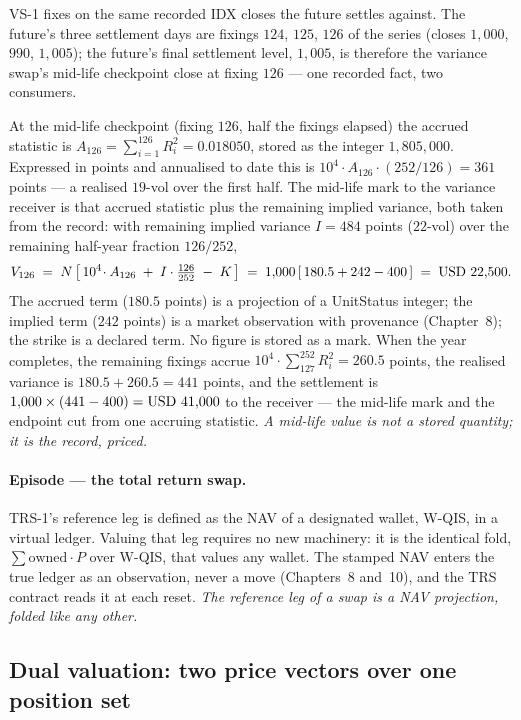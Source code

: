 VS-1 fixes on the same recorded IDX closes the future settles against. The
future's three settlement days are fixings $124$, $125$, $126$ of the series
(closes $1{,}000$, $990$, $1{,}005$); the future's final settlement level,
$1{,}005$, is therefore the variance swap's mid-life checkpoint close at fixing
$126$ --- one recorded fact, two consumers.

At the mid-life checkpoint (fixing $126$, half the fixings elapsed) the accrued
statistic is $A_{126} = \sum_{i=1}^{126} R_i^2 = 0.018050$, stored as the
integer $1{,}805{,}000$. Expressed in points and annualised to date this is
$10^4 \cdot A_{126}\cdot(252/126) = 361$ points --- a realised $19$-vol over the
first half. The mid-life mark to the variance receiver is that accrued
statistic plus the remaining implied variance, both taken from the record: with
remaining implied variance $I = 484$ points ($22$-vol) over the remaining
half-year fraction $126/252$,
\[
  V_{126} \;=\; N\left[\,10^4\!\cdot A_{126} \;+\; I\cdot\tfrac{126}{252} \;-\; K\,\right]
         \;=\; 1{,}000\left[\,180.5 + 242 - 400\,\right] \;=\; \mbox{USD~22,500}.
\]
The accrued term ($180.5$ points) is a projection of a UnitStatus integer; the
implied term ($242$ points) is a market observation with provenance
(Chapter~8); the strike is a declared term. No figure is stored as a mark. When
the year completes, the remaining fixings accrue $10^4\!\cdot\!\sum_{127}^{252}
R_i^2 = 260.5$ points, the realised variance is $180.5 + 260.5 = 441$ points,
and the settlement is $1{,}000\times(441 - 400) = \mbox{USD~41,000}$ to the receiver
--- the mid-life mark and the endpoint cut from one accruing statistic.
\emph{A mid-life value is not a stored quantity; it is the record, priced.}

\paragraph{Episode --- the total return swap.}
TRS-1's reference leg is defined as the NAV of a designated wallet, W-QIS, in a
virtual ledger. Valuing that leg requires no new machinery: it is the identical
fold, $\sum \mathrm{owned}\cdot P$ over W-QIS, that values any wallet. The
stamped NAV enters the true ledger as an observation, never a move
(Chapters~8 and~10), and the TRS contract reads it at each reset.
\emph{The reference leg of a swap is a NAV projection, folded like any other.}

\subsection{Dual valuation: two price vectors over one position set}

